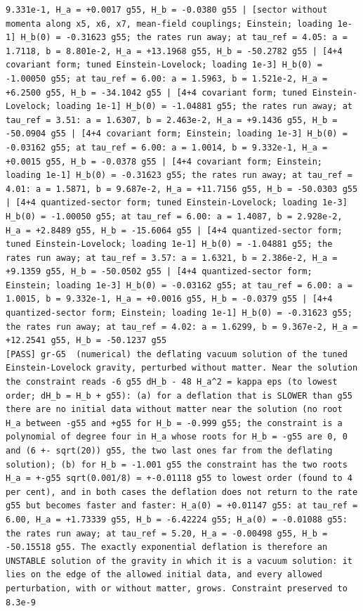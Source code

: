 \documentclass[
  10pt,
]{article}
\begin{document}
\begin{verbatim}
9.331e-1, H_a = +0.0017 g55, H_b = -0.0380 g55 | [sector without momenta along x5, x6, x7, mean-field couplings; Einstein; loading 1e-1] H_b(0) = -0.31623 g55; the rates run away; at tau_ref = 4.05: a = 1.7118, b = 8.801e-2, H_a = +13.1968 g55, H_b = -50.2782 g55 | [4+4 covariant form; tuned Einstein-Lovelock; loading 1e-3] H_b(0) = -1.00050 g55; at tau_ref = 6.00: a = 1.5963, b = 1.521e-2, H_a = +6.2500 g55, H_b = -34.1042 g55 | [4+4 covariant form; tuned Einstein-Lovelock; loading 1e-1] H_b(0) = -1.04881 g55; the rates run away; at tau_ref = 3.51: a = 1.6307, b = 2.463e-2, H_a = +9.1436 g55, H_b = -50.0904 g55 | [4+4 covariant form; Einstein; loading 1e-3] H_b(0) = -0.03162 g55; at tau_ref = 6.00: a = 1.0014, b = 9.332e-1, H_a = +0.0015 g55, H_b = -0.0378 g55 | [4+4 covariant form; Einstein; loading 1e-1] H_b(0) = -0.31623 g55; the rates run away; at tau_ref = 4.01: a = 1.5871, b = 9.687e-2, H_a = +11.7156 g55, H_b = -50.0303 g55 | [4+4 quantized-sector form; tuned Einstein-Lovelock; loading 1e-3] H_b(0) = -1.00050 g55; at tau_ref = 6.00: a = 1.4087, b = 2.928e-2, H_a = +2.8489 g55, H_b = -15.6064 g55 | [4+4 quantized-sector form; tuned Einstein-Lovelock; loading 1e-1] H_b(0) = -1.04881 g55; the rates run away; at tau_ref = 3.57: a = 1.6321, b = 2.386e-2, H_a = +9.1359 g55, H_b = -50.0502 g55 | [4+4 quantized-sector form; Einstein; loading 1e-3] H_b(0) = -0.03162 g55; at tau_ref = 6.00: a = 1.0015, b = 9.332e-1, H_a = +0.0016 g55, H_b = -0.0379 g55 | [4+4 quantized-sector form; Einstein; loading 1e-1] H_b(0) = -0.31623 g55; the rates run away; at tau_ref = 4.02: a = 1.6299, b = 9.367e-2, H_a = +12.2541 g55, H_b = -50.1237 g55
[PASS] gr-G5  (numerical) the deflating vacuum solution of the tuned Einstein-Lovelock gravity, perturbed without matter. Near the solution the constraint reads -6 g55 dH_b - 48 H_a^2 = kappa eps (to lowest order; dH_b = H_b + g55): (a) for a deflation that is SLOWER than g55 there are no initial data without matter near the solution (no root H_a between -g55 and +g55 for H_b = -0.999 g55; the constraint is a polynomial of degree four in H_a whose roots for H_b = -g55 are 0, 0 and (6 +- sqrt(20)) g55, the two last ones far from the deflating solution); (b) for H_b = -1.001 g55 the constraint has the two roots H_a = +-g55 sqrt(0.001/8) = +-0.01118 g55 to lowest order (found to 4 per cent), and in both cases the deflation does not return to the rate g55 but becomes faster and faster: H_a(0) = +0.01147 g55: at tau_ref = 6.00, H_a = +1.73339 g55, H_b = -6.42224 g55; H_a(0) = -0.01088 g55: the rates run away; at tau_ref = 5.20, H_a = -0.00498 g55, H_b = -50.15518 g55. The exactly exponential deflation is therefore an UNSTABLE solution of the gravity in which it is a vacuum solution: it lies on the edge of the allowed initial data, and every allowed perturbation, with or without matter, grows. Constraint preserved to 8.3e-9
\end{verbatim}
\end{document}
